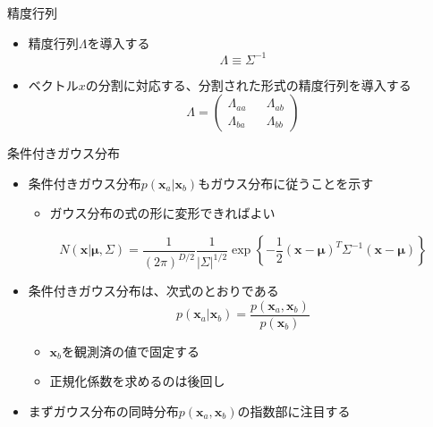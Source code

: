 \begin{frame}{精度行列}
 \begin{itemize}
  \item \alert{精度行列}$\Lambda$を導入する
        \begin{equation}
         \Lambda \equiv \Sigma^{-1}
        \end{equation}

  \item ベクトル$x$の分割に対応する、分割された形式の精度行列を導入する
        \begin{equation}
         \Lambda=
          \begin{pmatrix}
           \Lambda_{aa} && \Lambda_{ab}\\
           \Lambda_{ba} && \Lambda_{bb}
          \end{pmatrix}
        \end{equation}
 \end{itemize}
\end{frame}


\begin{frame}{条件付きガウス分布}
 \begin{itemize}
  \item 条件付きガウス分布$p(\bm{x}_a|\bm{x}_b)$もガウス分布に従うことを示す
        \begin{itemize}
         \item ガウス分布の式の形に変形できればよい
        \end{itemize}
        \begin{equation}
         N(\bm{x}|\bm{\mu},\Sigma) = \frac{1}{(2\pi)^{D/2}}\frac{1}{|\Sigma|^{1/2}}\exp\left\{-\frac{1}{2}(\bm{x} - \bm{\mu})^{T}\Sigma^{-1}(\bm{x}-\bm{\mu})\right\}
        \end{equation}
  \item 条件付きガウス分布は、次式のとおりである
        \begin{equation}
         p(\bm{x}_a | \bm{x}_b) = \frac{p(\bm{x}_a, \bm{x}_b)}{p(\bm{x}_b)}
        \end{equation}
        \begin{itemize}
         \item $\bm{x}_b$を観測済の値で\alert{固定}する
         \item 正規化係数を求めるのは後回し
        \end{itemize}
  \item まずガウス分布の同時分布$p(\bm{x}_a,\bm{x}_b)$の指数部に注目する
 \end{itemize}
\end{frame}


